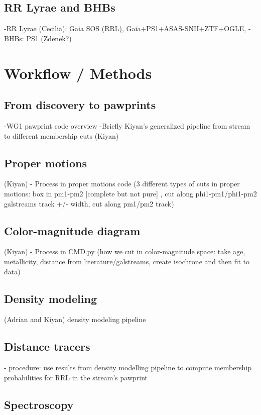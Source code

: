 \documentclass[twocolumn]{aastex63}
\begin{document}
\subsection{RR Lyrae and BHBs}

-RR Lyrae (Cecilia): Gaia SOS (RRL), Gaia+PS1+ASAS-SNII+ZTF+OGLE,
-BHBs: PS1 (Zdenek?)

\section{Workflow / Methods}

\subsection{From discovery to pawprints}

-WG1 pawprint code overview
-Briefly Kiyan's generalized pipeline from stream to different membership cuts (Kiyan)

\subsection{Proper motions}
(Kiyan)
- Process in proper motions code (3 different types of cuts in proper motions: box in pm1-pm2 [complete but not pure] , cut along phi1-pm1/phi1-pm2 galstreams track +/- width, cut along pm1/pm2 track)

\subsection{Color-magnitude diagram}
(Kiyan)
- Process in CMD.py (how we cut in color-magnitude space: take age, metallicity, distance from literature/galstreams, create isochrone and then fit to data)

\subsection{Density modeling}

(Adrian and Kiyan) density modeling pipeline

\subsection{Distance tracers}

- procedure: use results from density modelling pipeline to compute membership probabilities for RRL in the stream's pawprint

\subsection{Spectroscopy}
\end{document}
